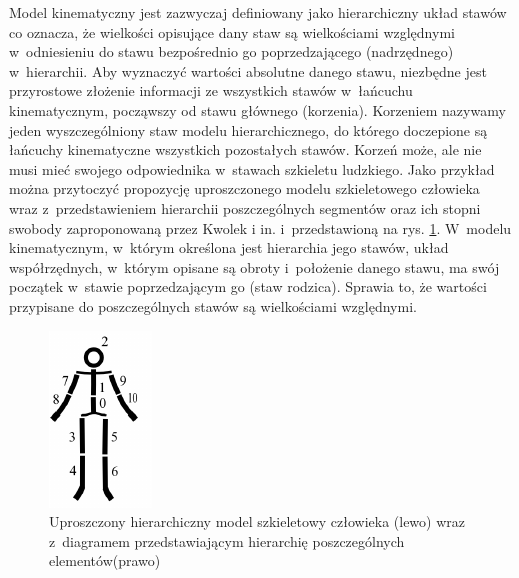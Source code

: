 Model kinematyczny jest zazwyczaj definiowany jako hierarchiczny układ stawów co oznacza, że wielkości opisujące dany staw są wielkościami względnymi w~odniesieniu do stawu bezpośrednio go poprzedzającego (nadrzędnego) w~hierarchii. Aby wyznaczyć wartości absolutne danego stawu, niezbędne jest przyrostowe złożenie informacji ze wszystkich stawów w~łańcuchu kinematycznym, począwszy od stawu głównego (korzenia). Korzeniem nazywamy jeden wyszczególniony staw modelu hierarchicznego, do którego doczepione są łańcuchy kinematyczne wszystkich pozostałych stawów. Korzeń może, ale nie musi mieć swojego odpowiednika w~stawach szkieletu ludzkiego. Jako przykład można przytoczyć propozycję uproszczonego modelu szkieletowego człowieka wraz z~przedstawieniem hierarchii poszczególnych segmentów oraz ich stopni swobody zaproponowaną przez Kwolek i in.\cite{Kwolek2014} i~przedstawioną na rys. \ref{fig:literature:skeletonModelHierarchy}. W~modelu kinematycznym, w~którym określona jest hierarchia jego stawów, układ współrzędnych, w~którym opisane są obroty i~położenie danego stawu, ma swój początek w~stawie poprzedzającym go (staw rodzica). Sprawia to, że wartości przypisane do poszczególnych stawów są wielkościami względnymi.
											
\begin{savenotes}
	\begin{figure}[!htb]
		\centering
		\begin{minipage}{.18\textwidth}
			\centering
			\includegraphics{images/hierarchical-structure.png}       
		\end{minipage}%
		\hfill
		\begin{minipage}{0.75\textwidth}
			\centering
			\scalebox{0.73}{
				
			}
		\end{minipage}
		\caption[Uproszczony hierarchiczny model szkieletowy człowieka wraz z~diagramem przedstawiającym hierarchię poszczególnych elementów]{Uproszczony hierarchiczny model szkieletowy człowieka (lewo) wraz z~diagramem przedstawiającym hierarchię poszczególnych elementów(prawo) \cite{Kwolek2014}}
		\label{fig:literature:skeletonModelHierarchy}
	\end{figure}
\end{savenotes}
													
